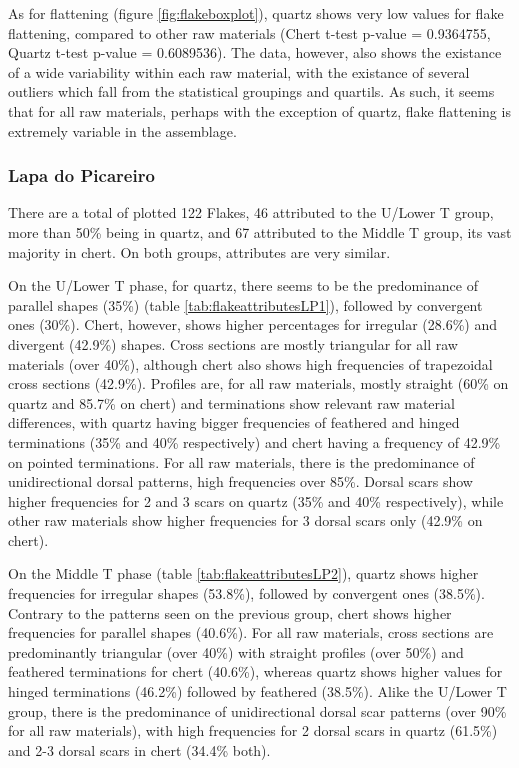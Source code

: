 \documentclass[12pt,twoside]{reedthesis}
\begin{document}
As for flattening (figure \ref{fig:flakeboxplot}), quartz shows very low values for flake flattening, compared to other raw materials (Chert t-test p-value = 0.9364755, Quartz t-test p-value = 0.6089536). The data, however, also shows the existance of a wide variability within each raw material, with the existance of several outliers which fall from the statistical groupings and quartils. As such, it seems that for all raw materials, perhaps with the exception of quartz, flake flattening is extremely variable in the assemblage.

\hypertarget{lapa-do-picareiro-5}{%
\subsubsection{Lapa do Picareiro}\label{lapa-do-picareiro-5}}

There are a total of plotted 122 Flakes, 46 attributed to the U/Lower T group, more than 50\% being in quartz, and 67 attributed to the Middle T group, its vast majority in chert. On both groups, attributes are very similar.

On the U/Lower T phase, for quartz, there seems to be the predominance of parallel shapes (35\%) (table \ref{tab:flakeattributesLP1}), followed by convergent ones (30\%). Chert, however, shows higher percentages for irregular (28.6\%) and divergent (42.9\%) shapes. Cross sections are mostly triangular for all raw materials (over 40\%), although chert also shows high frequencies of trapezoidal cross sections (42.9\%). Profiles are, for all raw materials, mostly straight (60\% on quartz and 85.7\% on chert) and terminations show relevant raw material differences, with quartz having bigger frequencies of feathered and hinged terminations (35\% and 40\% respectively) and chert having a frequency of 42.9\% on pointed terminations. For all raw materials, there is the predominance of unidirectional dorsal patterns, high frequencies over 85\%. Dorsal scars show higher frequencies for 2 and 3 scars on quartz (35\% and 40\% respectively), while other raw materials show higher frequencies for 3 dorsal scars only (42.9\% on chert).

On the Middle T phase (table \ref{tab:flakeattributesLP2}), quartz shows higher frequencies for irregular shapes (53.8\%), followed by convergent ones (38.5\%). Contrary to the patterns seen on the previous group, chert shows higher frequencies for parallel shapes (40.6\%). For all raw materials, cross sections are predominantly triangular (over 40\%) with straight profiles (over 50\%) and feathered terminations for chert (40.6\%), whereas quartz shows higher values for hinged terminations (46.2\%) followed by feathered (38.5\%). Alike the U/Lower T group, there is the predominance of unidirectional dorsal scar patterns (over 90\% for all raw materials), with high frequencies for 2 dorsal scars in quartz (61.5\%) and 2-3 dorsal scars in chert (34.4\% both).
\end{document}
